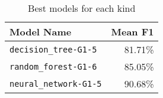 \begin{table}[H]
\centering
\capstart
\begin{tabularx}{0.48\textwidth}{|X|r|}
\hline
Model Name & Mean F1 \\
\hline
\texttt{decision\_tree-G1-5} & 81.71\% \\
\texttt{random\_forest-G1-6} & 85.05\% \\
\texttt{neural\_network-G1-5} & 90.68\% \\
\hline
\end{tabularx}
\caption{Best models for each kind}
\label{tab:best_model_per_kind}

\end{table}
